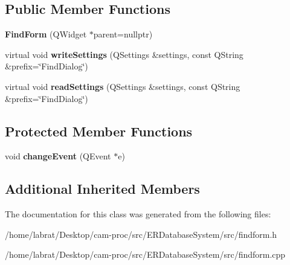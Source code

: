 \subsection*{Public Member Functions}
\begin{DoxyCompactItemize}
\item 
{\bfseries Find\+Form} (Q\+Widget $\ast$parent=nullptr)\hypertarget{classFindForm_ae75466b4fcaff9d34d3f47eeb868e869}{}\label{classFindForm_ae75466b4fcaff9d34d3f47eeb868e869}

\item 
virtual void {\bfseries write\+Settings} (Q\+Settings \&settings, const Q\+String \&prefix=\char`\"{}Find\+Dialog\char`\"{})\hypertarget{classFindForm_a8d9f1b06d14a58d2d2a91d1d82205b4d}{}\label{classFindForm_a8d9f1b06d14a58d2d2a91d1d82205b4d}

\item 
virtual void {\bfseries read\+Settings} (Q\+Settings \&settings, const Q\+String \&prefix=\char`\"{}Find\+Dialog\char`\"{})\hypertarget{classFindForm_abfa26fe2e262103bbd9d694e748c0884}{}\label{classFindForm_abfa26fe2e262103bbd9d694e748c0884}

\end{DoxyCompactItemize}
\subsection*{Protected Member Functions}
\begin{DoxyCompactItemize}
\item 
void {\bfseries change\+Event} (Q\+Event $\ast$e)\hypertarget{classFindForm_aa1ee766531453cc558ff1a8efbfd9bf6}{}\label{classFindForm_aa1ee766531453cc558ff1a8efbfd9bf6}

\end{DoxyCompactItemize}
\subsection*{Additional Inherited Members}


The documentation for this class was generated from the following files\+:\begin{DoxyCompactItemize}
\item 
/home/labrat/\+Desktop/cam-\/proc/src/\+E\+R\+Database\+System/src/findform.\+h\item 
/home/labrat/\+Desktop/cam-\/proc/src/\+E\+R\+Database\+System/src/findform.\+cpp\end{DoxyCompactItemize}

